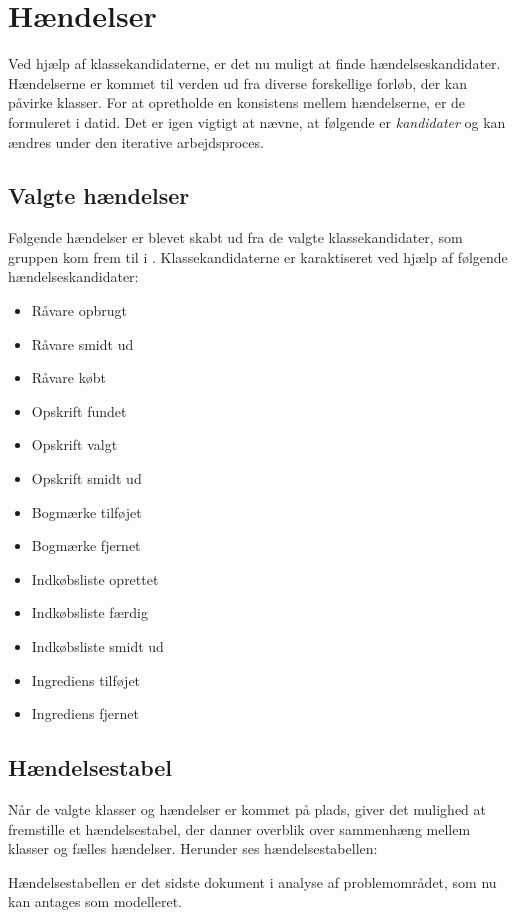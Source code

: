 \section{Hændelser}
\label{sec:haendelser}
Ved hjælp af klassekandidaterne, er det nu muligt at finde hændelseskandidater. Hændelserne er kommet til verden ud fra diverse forskellige forløb, der kan påvirke klasser. For at opretholde en konsistens mellem hændelserne, er de formuleret i datid. Det er igen vigtigt at nævne, at følgende er \emph{kandidater} og kan ændres under den iterative arbejdsproces. 

\subsection{Valgte hændelser}
Følgende hændelser er blevet skabt ud fra de valgte klassekandidater, som gruppen kom frem til i . Klassekandidaterne er karaktiseret ved hjælp af følgende hændelseskandidater: 

\begin{itemize} [noitemsep]
\item Råvare opbrugt
\item Råvare smidt ud
\item Råvare købt
\item Opskrift fundet
\item Opskrift valgt
\item Opskrift smidt ud
\item Bogmærke tilføjet
\item Bogmærke fjernet
\item Indkøbsliste oprettet
\item Indkøbsliste færdig
\item Indkøbsliste smidt ud
\item Ingrediens tilføjet
\item Ingrediens fjernet
\end{itemize}

\subsection{Hændelsestabel}
Når de valgte klasser og hændelser er kommet på plads, giver det mulighed at fremstille et hændelsestabel, der danner overblik over sammenhæng mellem klasser og fælles hændelser. Herunder ses hændelsestabellen:



Hændelsestabellen er det sidste dokument i analyse af problemområdet, som nu kan antages som modelleret. 

